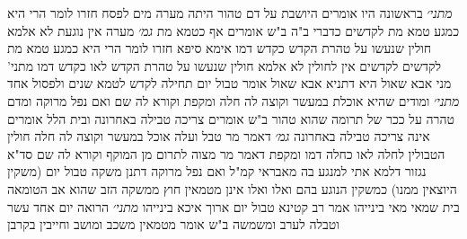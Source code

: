 \documentclass[12pt, openany]{book}
\begin{document}
{{\large\emph{מתני׳}} בראשונה היו אומרים היושבת על דם טהור היתה מערה מים לפסח 
חזרו לומר הרי היא כמגע טמא מת לקדשים כדברי ב"ה ב"ש אומרים אף כטמא מת
{\large\emph{גמ׳}} מערה אין נוגעת לא אלמא חולין שנעשו על טהרת הקדש כקדש דמו 
אימא סיפא חזרו לומר הרי היא כמגע טמא מת לקדשים לקדשים אין לחולין לא אלמא חולין שנעשו על טהרת הקדש לאו כקדש דמו 
מתני' מני אבא שאול היא דתניא אבא שאול אומר טבול יום תחילה לקדש לטמא שנים ולפסול אחד
{\large\emph{מתני׳}} ומודים שהיא אוכלת במעשר וקוצה לה חלה ומקפת וקורא לה שם 
ואם נפל מרוקה ומדם טהרה על ככר של תרומה שהוא טהור
ב"ש אומרים צריכה טבילה באחרונה ובית הלל אומרים אינה צריכה טבילה באחרונה
{\large\emph{גמ׳}} דאמר מר טבל ועלה אוכל במעשר
וקוצה לה חלה חולין הטבולין לחלה לאו כחלה דמו
ומקפת דאמר מר מצוה לתרום מן המוקף
וקורא לה שם סד"א נגזור דלמא אתי למנגע בה מאבראי קמ"ל
ואם נפל מרוקה דתנן משקה טבול יום (משקין היוצאין ממנו) כמשקין הנוגע בהם ואלו ואלו אינן מטמאין חוץ ממשקה הזב שהוא אב הטומאה
בית שמאי מאי בינייהו אמר רב קטינא טבול יום ארוך איכא בינייהו
{\large\emph{מתני׳}} הרואה יום אחד עשר וטבלה לערב ומשמשה 
ב"ש אומר מטמאין משכב ומושב וחייבין בקרבן}
\end{document}
